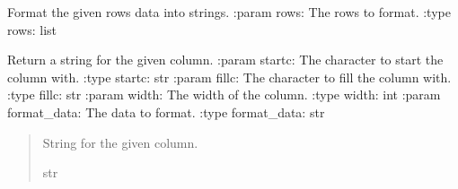 \documentclass[letterpaper,10pt,english]{sphinxmanual}
\begin{document}
\begin{fulllineitems}
\begin{fulllineitems}
\end{fulllineitems}


\begin{fulllineitems}
\label{\detokenize{nodes:nodes.nodePrinter.tablePrinter.format_rows}}
\pysigstartsignatures
\pysiglinewithargsret
{}
{}
{}
\pysigstopsignatures
\sphinxAtStartPar
Format the given rows data into strings.
:param rows: The rows to format.
:type rows: list

\end{fulllineitems}


\begin{fulllineitems}
\label{\detokenize{nodes:nodes.nodePrinter.tablePrinter.get_col_string}}
\pysigstartsignatures
\pysiglinewithargsret
{}
{\sphinxparamcomma {}\sphinxparamcomma {}\sphinxparamcomma {}}
{}
\pysigstopsignatures
\sphinxAtStartPar
Return a string for the given column.
:param startc: The character to start the column with.
:type startc: str
:param fillc: The character to fill the column with.
:type fillc: str
:param width: The width of the column.
:type width: int
:param format\_data: The data to format.
:type format\_data: str
\begin{quote}\begin{description}
\sphinxAtStartPar
String for the given column.

\sphinxAtStartPar
str

\end{description}\end{quote}

\end{fulllineitems}



\end{fulllineitems}
\end{document}
